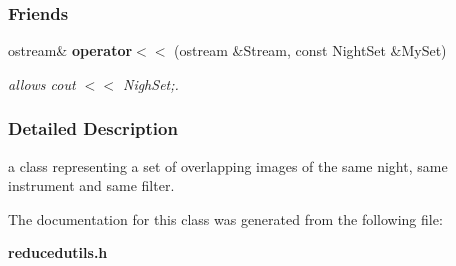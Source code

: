\subsubsection*{Friends}
\begin{CompactItemize}
\item 
{}
ostream\& {\bf operator$<$$<$} (ostream \&Stream, const Night\-Set \&My\-Set)\label{class_nightset_l0}

\begin{CompactList}\small\item\em allows cout $<$$<$ Nigh\-Set;.\item\end{CompactList}\end{CompactItemize}


\subsubsection{Detailed Description}
a class representing a set of overlapping images of the same night, same instrument and same filter.



The documentation for this class was generated from the following file:\begin{CompactItemize}
\item 
{\bf reducedutils.h}\end{CompactItemize}
